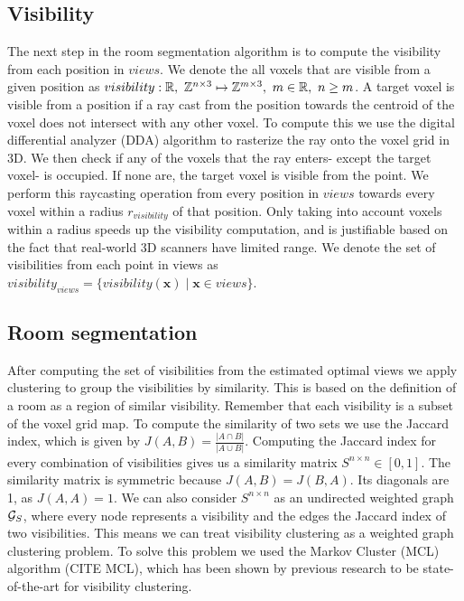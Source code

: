 \documentclass{article}
\begin{document}
\subsection{Visibility}
The next step in the room segmentation algorithm is to compute the visibility from each position in \(views\). We denote the all voxels that are visible from a given position as \(visibility: \mathbb{R},\ \mathbb{Z}^{n \times 3} \mapsto \mathbb{Z}^{m \times 3},\ m \in \mathbb{R},\ n \geq m\). A target voxel is visible from a position if a ray cast from the position towards the centroid of the voxel does not intersect with any other voxel. To compute this we use the digital differential analyzer (DDA) algorithm to rasterize the ray onto the voxel grid in 3D. We then check if any of the voxels that the ray enters- except the target voxel- is occupied. If none are, the target voxel is visible from the point. We perform this raycasting operation from every position in \(views\) towards every voxel within a radius \(r_{visibility}\) of that position. Only taking into account voxels within a radius speeds up the visibility computation, and is justifiable based on the fact that real-world 3D scanners have limited range. We denote the set of visibilities from each point in views as \(visibility_{views} = \{visibility(\boldsymbol{x}) \mid \boldsymbol{x} \in views\}\).

\subsection{Room segmentation}
After computing the set of visibilities from the estimated optimal views we apply clustering to group the visibilities by similarity. This is based on the definition of a room as a region of similar visibility. Remember that each visibility is a subset of the voxel grid map. To compute the similarity of two sets we use the Jaccard index, which is given by \(J(A,B) = \frac{|A \cap B|}{|A \cup B|}\). Computing the Jaccard index for every combination of visibilities gives us a similarity matrix \(S^{n \times n} \in [0, 1]\). The similarity matrix is symmetric because \(J(A,B) = J(B,A)\). Its diagonals are 1, as \(J(A,A) = 1\). We can also consider \(S^{n \times n}\) as an undirected weighted graph \(\mathcal{G}_S\), where every node represents a visibility and the edges the Jaccard index of two visibilities. This means we can treat visibility clustering as a weighted graph clustering problem. To solve this problem we used the Markov Cluster (MCL) algorithm (CITE MCL), which has been shown by previous research to be state-of-the-art for visibility clustering. 
\end{document}
